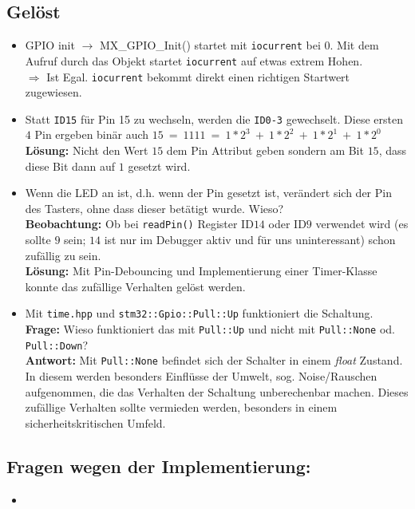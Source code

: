 \subsection*{Gelöst}
\begin{itemize}
	\item GPIO init $\rightarrow$ MX\_GPIO\_Init() startet mit \texttt{iocurrent} bei $0$. Mit dem Aufruf durch das Objekt startet \texttt{iocurrent} auf etwas extrem Hohen. \\ $\Longrightarrow$ Ist Egal. \texttt{iocurrent} bekommt direkt einen richtigen Startwert zugewiesen.
	\item Statt \texttt{ID15} für Pin 15 zu wechseln, werden die \texttt{ID0-3} gewechselt. Diese ersten $4$ Pin ergeben binär auch $15\ =\ 1111\ =\ 1*2^3\ +\ 1*2^2\ +\ 1*2^1\ +\ 1*2^0$ \\ \textbf{Lösung:} Nicht den Wert $15$ dem Pin Attribut geben sondern am Bit $15$, dass diese Bit dann auf $1$ gesetzt wird.
	\item Wenn die LED an ist, d.h. wenn der Pin gesetzt ist, verändert sich der Pin des Tasters, ohne dass dieser betätigt wurde. Wieso?\\ \textbf{Beobachtung:} Ob bei \texttt{readPin()} Register ID$14$ oder ID$9$ verwendet wird (es sollte $9$ sein; $14$ ist nur im Debugger aktiv und für uns uninteressant) schon zufällig zu sein.\\ \textbf{Lösung:} Mit Pin-Debouncing und Implementierung einer Timer-Klasse konnte das zufällige Verhalten gelöst werden. 
	\item Mit \texttt{time.hpp} und \texttt{stm32::Gpio::Pull::Up} funktioniert die Schaltung.\\ \textbf{Frage:} Wieso funktioniert das mit \texttt{Pull::Up} und nicht mit \texttt{Pull::None} od. \texttt{Pull::Down}?\\ \textbf{Antwort:} Mit \texttt{Pull::None} befindet sich der Schalter in einem \emph{float} Zustand. In diesem werden besonders Einflüsse der Umwelt, sog. Noise/Rauschen aufgenommen, die das Verhalten der Schaltung unberechenbar machen. Dieses zufällige Verhalten sollte vermieden werden, besonders in einem sicherheitskritischen Umfeld.
\end{itemize}

\subsection*{Fragen wegen der Implementierung:}
\begin{itemize}
	\item 
\end{itemize}

